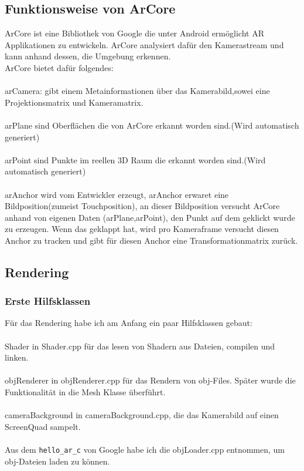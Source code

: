 \subsection{Funktionsweise von ArCore}
ArCore ist eine Bibliothek von Google die unter Android ermöglicht AR Applikationen zu entwickeln.
ArCore analysiert dafür den Kamerastream und kann anhand dessen, die Umgebung erkennen.\\
ArCore bietet dafür folgendes:
\\ \\
arCamera: gibt einem Metainformationen über das Kamerabild,sowei eine Projektionsmatrix und Kameramatrix.
\\ \\
arPlane sind Oberflächen die von ArCore erkannt worden sind.(Wird automatisch generiert)
\\ \\
arPoint sind Punkte im reellen 3D Raum die erkannt worden sind.(Wird automatisch generiert)
\\ \\
arAnchor wird vom Entwickler erzeugt, arAnchor erwaret eine Bildposition(zumeist Touchposition), an dieser Bildposition versucht ArCore anhand von eigenen Daten (arPlane,arPoint), den Punkt auf dem geklickt wurde zu erzeugen. Wenn das geklappt hat, wird pro Kameraframe versucht diesen Anchor zu tracken und gibt für diesen Anchor eine Transformationmatrix zurück.


\subsection{Rendering}
\subsubsection{Erste Hilfsklassen}
Für das Rendering habe ich am Anfang ein paar Hilfsklassen gebaut:\\ \\
Shader in Shader.cpp für das lesen von Shadern aus Dateien, compilen und linken.\\ \\
objRenderer in objRenderer.cpp für das Rendern von obj-Files. Später wurde die
Funktionalität in die Mesh Klasse überführt.\\ \\
cameraBackground in cameraBackground.cpp, die das Kamerabild auf einen ScreenQuad sampelt.\\ \\
Aus dem \verb|hello_ar_c| von Google habe ich die objLoader.cpp entnommen, um obj-Dateien
laden zu können.
